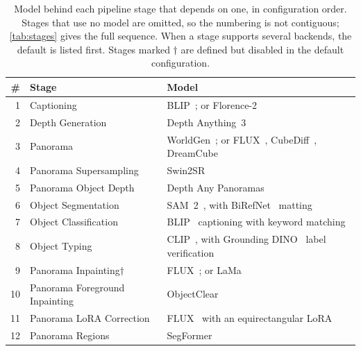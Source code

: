 \begin{table}[htbp]
\centering
\small
\caption{Model behind each pipeline stage that depends on one, in configuration
order. Stages that use no model are omitted, so the numbering is not contiguous;
\cref{tab:stages} gives the full sequence. When a stage supports several
backends, the default is listed first. Stages marked $\dagger$ are defined but
disabled in the default configuration.}
\label{tab:stagemodels}
\begin{tabular}{@{}r l >{\raggedright\arraybackslash}p{8.1cm}@{}}
\toprule
\textbf{\#} & \textbf{Stage} & \textbf{Model} \\
\midrule
1  & Captioning                     & BLIP~\cite{li2022blipbootstrappinglanguageimagepretraining}; or Florence-2~\cite{xiao2024florence2} \\
2  & Depth Generation               & Depth Anything~3~\cite{lin2025depth3recoveringvisual} \\
3  & Panorama                       & WorldGen~\cite{worldgen2025ziyangxie}; or FLUX~\cite{esser2024scalingrectifiedflowtransformers}, CubeDiff~\cite{kalischek2025cubediffrepurposingdiffusionbasedimage}, DreamCube~\cite{dreamcube} \\
4  & Panorama Supersampling         & Swin2SR~\cite{conde2022swin2srswinv2transformercompressed} \\
5  & Panorama Object Depth          & Depth Any Panoramas~\cite{lin2025dap} \\
6  & Object Segmentation            & SAM~2~\cite{ravi2024sam2segmentimages}, with BiRefNet~\cite{zheng2024birefnet} matting \\
7  & Object Classification          & BLIP~\cite{li2022blipbootstrappinglanguageimagepretraining} captioning with keyword matching \\
8  & Object Typing                  & CLIP~\cite{radford2021learningtransferablevisual}, with Grounding DINO~\cite{liu2024groundingdino} label verification \\
9  & Panorama Inpainting$\dagger$   & FLUX~\cite{esser2024scalingrectifiedflowtransformers}; or LaMa~\cite{suvorov2021resolution} \\
10 & Panorama Foreground Inpainting & ObjectClear~\cite{zhao2026objectclear} \\
11 & Panorama LoRA Correction       & FLUX~\cite{esser2024scalingrectifiedflowtransformers} with an equirectangular LoRA \\
12 & Panorama Regions               & SegFormer~\cite{DBLP:journals/corr/abs-2105-15203} \\

\end{tabular}
\end{table}
